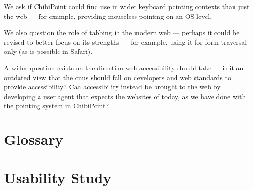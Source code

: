 \documentclass[11pt,openright,a4paper]{report}
\begin{document}
We ask if ChibiPoint could find use in wider keyboard pointing contexts than just the web --- for example, providing mouseless pointing on an OS-level.

We also question the role of tabbing in the modern web --- perhaps it could be revised to better focus on its strengths --- for example, using it for form traversal only (as is possible in Safari).

A wider question exists on the direction web accessibility should take --- is it an outdated view that the onus should fall on developers and web standards to provide accessibility? Can accessibility instead be brought to the web by developing a user agent that expects the websites of today, as we have done with the pointing system in ChibiPoint?

\pagebreak
\chapter{Glossary}
\printglossary

\clearpage


{}
\printbibliography

\clearpage
{}
{}
\appendix
\chapter{Usability Study}
\end{document}

